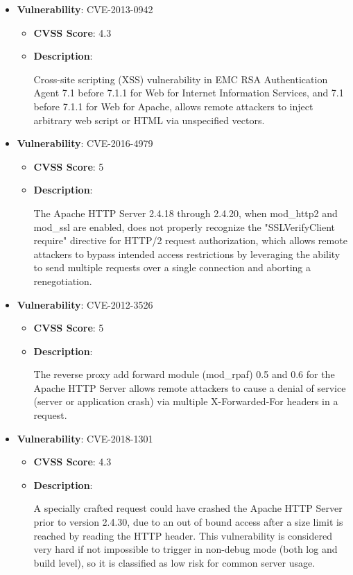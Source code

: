 \documentclass{article}
\begin{document}
\begin{itemize}
        \item \textbf{Vulnerability}: CVE-2013-0942
        \begin{itemize}
            \item \textbf{CVSS Score}:  4.3 
            \item \textbf{Description}:
            \parbox[t]{0.9\linewidth}{
                \ttfamily Cross-site scripting (XSS) vulnerability in EMC RSA Authentication Agent 7.1 before 7.1.1 for Web for Internet Information Services, and 7.1 before 7.1.1 for Web for Apache, allows remote attackers to inject arbitrary web script or HTML via unspecified vectors.
            }
        \end{itemize}
    
        \item \textbf{Vulnerability}: CVE-2016-4979
        \begin{itemize}
            \item \textbf{CVSS Score}:  5 
            \item \textbf{Description}:
            \parbox[t]{0.9\linewidth}{
                \ttfamily The Apache HTTP Server 2.4.18 through 2.4.20, when mod\_http2 and mod\_ssl are enabled, does not properly recognize the "SSLVerifyClient require" directive for HTTP/2 request authorization, which allows remote attackers to bypass intended access restrictions by leveraging the ability to send multiple requests over a single connection and aborting a renegotiation.
            }
        \end{itemize}
    
        \item \textbf{Vulnerability}: CVE-2012-3526
        \begin{itemize}
            \item \textbf{CVSS Score}:  5 
            \item \textbf{Description}:
            \parbox[t]{0.9\linewidth}{
                \ttfamily The reverse proxy add forward module (mod\_rpaf) 0.5 and 0.6 for the Apache HTTP Server allows remote attackers to cause a denial of service (server or application crash) via multiple X-Forwarded-For headers in a request.
            }
        \end{itemize}
    
        \item \textbf{Vulnerability}: CVE-2018-1301
        \begin{itemize}
            \item \textbf{CVSS Score}:  4.3 
            \item \textbf{Description}:
            \parbox[t]{0.9\linewidth}{
                \ttfamily A specially crafted request could have crashed the Apache HTTP Server prior to version 2.4.30, due to an out of bound access after a size limit is reached by reading the HTTP header. This vulnerability is considered very hard if not impossible to trigger in non-debug mode (both log and build level), so it is classified as low risk for common server usage.
            }
        \end{itemize}
    

\end{itemize}
\end{document}
